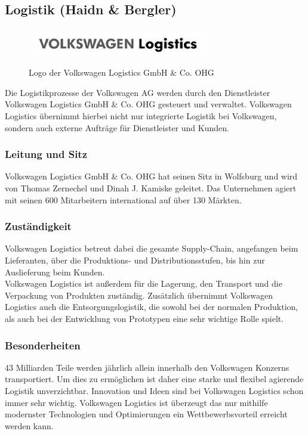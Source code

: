 \documentclass[12pt]{article}
\begin{document}
\subsection{Logistik (Haidn \& Bergler)}
\begin{figure}[here!]
	\centering
	\includegraphics[width=0.7\textwidth]{images/logologistics.jpg}
	\caption{Logo der Volkswagen Logistics GmbH \& Co. OHG}
	\label{fig:vwlogisticspic}
	\cite{vwlogisticspic}
\end{figure}\FloatBarrier
Die Logistikprozesse der Volkswagen AG werden durch den Dienstleister Volkswagen Logistics GmbH \& Co. OHG gesteuert und verwaltet.
Volkswagen Logistics übernimmt hierbei nicht nur integrierte Logistik bei Volkswagen, sondern auch externe Aufträge für Dienstleister und Kunden.\cite{vwlogistics}

\subsubsection{Leitung und Sitz}
Volkswagen Logistics GmbH \& Co. OHG hat seinen Sitz in Wolfsburg und wird von Thomas Zernechel und Dinah J. Kamiske geleitet.
Das Unternehmen agiert mit seinen 600 Mitarbeitern international auf über 130 Märkten.\cite{vwlogistics}

\subsubsection{Zuständigkeit}
Volkswagen Logistics betreut dabei die gesamte Supply-Chain, angefangen beim Lieferanten, über die Produktions- und Distributionsstufen, bis hin zur Auslieferung beim Kunden.\\
Volkswagen Logistics ist außerdem für die Lagerung, den Transport und die Verpackung von Produkten zuständig. Zusätzlich übernimmt Volkswagen Logistics auch die Entsorgungslogistik, die sowohl bei der normalen Produktion, als auch bei der Entwicklung von Prototypen eine sehr wichtige Rolle spielt.\cite{vwlogistics}

\subsubsection{Besonderheiten}
43 Milliarden Teile werden jährlich allein innerhalb den Volkswagen Konzerns transportiert. Um dies zu ermöglichen ist daher eine starke und flexibel agierende Logistik unverzichtbar.
Innovation und Ideen sind bei Volkswagen Logistics schon immer sehr wichtig. Volkswagen Logistics ist überzeugt das nur mithilfe modernster Technologien und Optimierungen ein Wettbewerbsvorteil erreicht werden kann.
\end{document}
